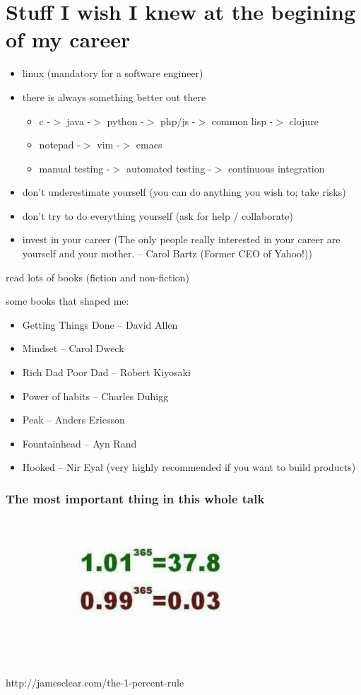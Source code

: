 \documentclass{beamer}
\begin{document}
\section{Stuff I wish I knew at the begining of my career}
\begin{frame}
  \begin{itemize}[<+->]
  \item linux (mandatory for a software engineer)
  \item there is always something better out there
    \begin{itemize}
    \item c -$>$ java -$>$ python -$>$ php/js -$>$ common lisp -$>$ clojure
    \item notepad -$>$ vim -$>$ emacs
    \item manual testing -$>$ automated testing -$>$ continuous integration
    \end{itemize}
  \item don't underestimate yourself (you can do anything you wish to; take risks)
  \item don't try to do everything yourself (ask for help / collaborate)
  \item invest in your career (The only people really interested in your career are yourself and your mother. -- Carol Bartz (Former CEO of Yahoo!))
  \end{itemize}
\end{frame}
\begin{frame}
  read lots of books (fiction and non-fiction)

  some books that shaped me:
  \begin{itemize}
  \item Getting Things Done -- David Allen
  \item Mindset -- Carol Dweck
  \item Rich Dad Poor Dad -- Robert Kiyosaki
  \item Power of habits -- Charles Duhigg
  \item Peak -- Anders Ericsson
  \item Fountainhead -- Ayn Rand
  \item Hooked -- Nir Eyal (very highly recommended if you want to build products)
  \end{itemize}
\end{frame}
\begin{frame}
  \frametitle{The most important thing in this whole talk}
  \includegraphics[height=5.4cm,width=10.8cm]{Screenshot_2017-05-20-09-10-52-736.png}

  http://jamesclear.com/the-1-percent-rule
\end{frame}
\end{document}

